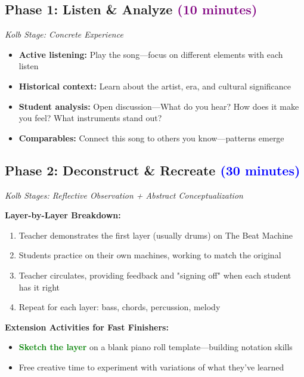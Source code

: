 \documentclass[11pt,letterpaper]{article}
\newcommand{\greentext}[1]{\textcolor{green}{\textbf{#1}}}
\begin{document}
\vspace{0.5cm}

\subsection*{Phase 1: Listen \& Analyze \texorpdfstring{\textcolor{purple}{(10 minutes)}}{(10 minutes)}}
\textit{Kolb Stage: Concrete Experience}

\begin{itemize}[leftmargin=*]
\item \textbf{Active listening:} Play the song—focus on different elements with each listen
\item \textbf{Historical context:} Learn about the artist, era, and cultural significance
\item \textbf{Student analysis:} Open discussion—What do you hear? How does it make you feel? What instruments stand out?
\item \textbf{Comparables:} Connect this song to others you know—patterns emerge
\end{itemize}

\subsection*{Phase 2: Deconstruct \& Recreate \texorpdfstring{\textcolor{blue}{(30 minutes)}}{(30 minutes)}}
\textit{Kolb Stages: Reflective Observation + Abstract Conceptualization}

\textbf{Layer-by-Layer Breakdown:}
\begin{enumerate}[leftmargin=*]
\item Teacher demonstrates the first layer (usually drums) on The Beat Machine
\item Students practice on their own machines, working to match the original
\item Teacher circulates, providing feedback and "signing off" when each student has it right
\item Repeat for each layer: bass, chords, percussion, melody
\end{enumerate}

\textbf{Extension Activities for Fast Finishers:}
\begin{itemize}[leftmargin=*]
\item \greentext{Sketch the layer} on a blank piano roll template—building notation skills
\item Free creative time to experiment with variations of what they've learned
\end{itemize}
\end{document}
